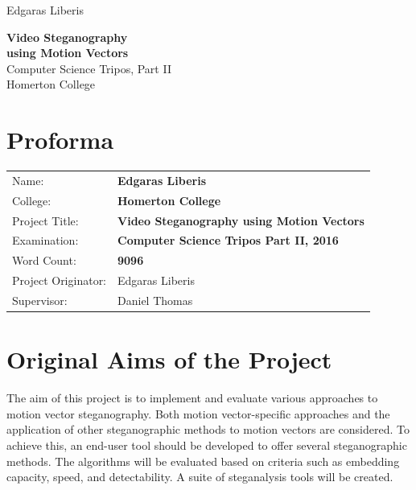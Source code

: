 \documentclass[12pt,british,twoside,notitlepage,usenames,dvipsnames,hypens,final]{report}
\numberwithin{equation}{section}
\numberwithin{figure}{section}
\begin{document}
\pagestyle{empty}

\hfill{\LARGE Edgaras Liberis}

\vspace*{60mm}
\begin{center}
\Huge
{\bf Video Steganography \\ using Motion Vectors} \\
\vspace*{10mm}
{ \sc \LARGE
Computer Science Tripos, Part II \\
Homerton College \\
}
\vspace*{10mm}
\the\year 
\end{center}

\cleardoublepage

\setcounter{page}{3}
\pagestyle{plain}

{\section*{\Huge Proforma}}

{\large
\begin{tabular}{ll}
Name:               & \bf Edgaras Liberis                          \\
College:            & \bf Homerton College                         \\
Project Title:      & \bf Video Steganography using Motion Vectors \\
Examination:        & \bf Computer Science Tripos Part II, 2016    \\
Word Count:         & \bf 9096\footnotemark[1]                     \\
Project Originator: & Edgaras Liberis                              \\
Supervisor:         & Daniel Thomas                                \\ 
\end{tabular}
}
\vspace{0.5cm}

\section*{Original Aims of the Project}

The aim of this project is to implement and evaluate various approaches to motion vector steganography. Both motion vector-specific approaches and the application of other steganographic methods to motion vectors are considered. To achieve this, an end-user tool should be developed to offer several steganographic methods. The algorithms will be evaluated based on criteria such as embedding capacity, speed, and detectability. A suite of steganalysis tools will be created.  
\end{document}

